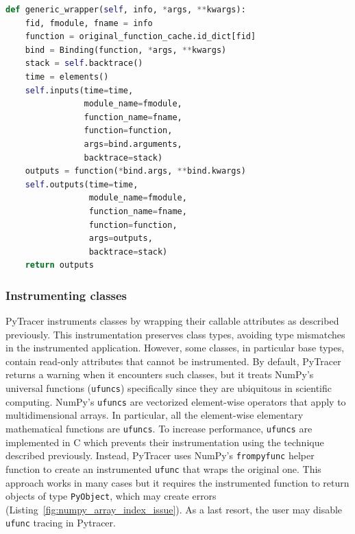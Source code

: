 \documentclass[11pt]{article}
\newcommand{\pytracer}[0]{PyTracer\xspace}
\begin{document}
\begin{listing}
    \centering
\begin{lstlisting}[language=Python,style=customPython,]
def generic_wrapper(self, info, *args, **kwargs):
    fid, fmodule, fname = info
    function = original_function_cache.id_dict[fid]
    bind = Binding(function, *args, **kwargs)
    stack = self.backtrace()
    time = elements()
    self.inputs(time=time,
                module_name=fmodule,
                function_name=fname,
                function=function,
                args=bind.arguments,
                backtrace=stack)
    outputs = function(*bind.args, **bind.kwargs)
    self.outputs(time=time,
                 module_name=fmodule,
                 function_name=fname,
                 function=function,
                 args=outputs,
                 backtrace=stack)
    return outputs
\end{lstlisting}
    \caption{\pytracer's wrapper function. 
    The \texttt{original\_function\_cache} maintains a mapping between the original function and its identifier (available through 
    \texttt{id} built-in function). Once the original function retrieved, the arguments are saved to the traces (through function 
    \texttt{self.inputs}). The actual function is called and the result is saved (function \texttt{self.outputs}) then returned.
    }
    \label{fig:generic_wrapper}
\end{listing}


\subsubsection{Instrumenting classes}

\pytracer instruments classes by wrapping their callable attributes as described previously. 
This instrumentation preserves class types, avoiding type mismatches in the instrumented application.
However, some classes, in particular base types, contain read-only attributes that cannot be instrumented. By default, \pytracer returns a warning when it encounters such classes, but it treats NumPy's universal functions (\texttt{ufuncs}) specifically since they are ubiquitous in scientific computing. NumPy's \texttt{ufuncs} are vectorized element-wise operators that apply to multidimensional arrays. In particular, all the element-wise elementary mathematical functions are \texttt{ufuncs}.  To increase performance, \texttt{ufuncs} are implemented in C which prevents their instrumentation using the technique described previously. Instead, \pytracer uses 
NumPy's \texttt{frompyfunc} helper function to create an instrumented \texttt{ufunc} that wraps the original one.
This approach works in many cases but it requires the instrumented function to return objects of type \texttt{PyObject}, which may create errors (Listing~\ref{fig:numpy_array_index_issue}). 
As a last resort, the user may disable \texttt{ufunc} tracing in Pytracer.
\end{document}
